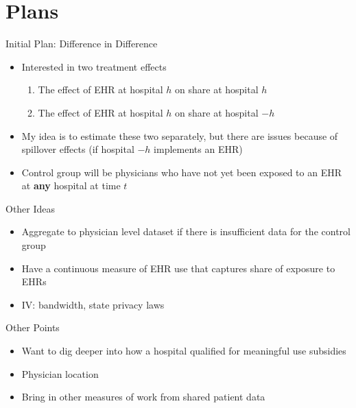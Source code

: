 \documentclass[10pt]{beamer}
\begin{document}
\section{Plans}

\begin{frame}{Initial Plan: Difference in Difference}
\begin{itemize}
    \item Interested in two treatment effects
    \begin{enumerate}
        \item The effect of EHR at hospital $h$ on share at hospital $h$
        \item The effect of EHR at hospital $h$ on share at hospital $-h$
    \end{enumerate}
    
    \vspace{2mm}
    
    \item My idea is to estimate these two separately, but there are issues because of spillover effects (if hospital $-h$ implements an EHR)
    
    \vspace{2mm}
    
    \item Control group will be physicians who have not yet been exposed to an EHR at \textbf{any} hospital at time $t$
\end{itemize}
\end{frame}

\begin{frame}{Other Ideas}
\begin{itemize}
    \item Aggregate to physician level dataset if there is insufficient data for the control group
    \item Have a continuous measure of EHR use that captures share of exposure to EHRs
    \item IV: bandwidth, state privacy laws
\end{itemize}
\end{frame}

\begin{frame}{Other Points}
\begin{itemize}
    \item Want to dig deeper into how a hospital qualified for meaningful use subsidies
    \item Physician location
    \item Bring in other measures of work from shared patient data
\end{itemize}
    
\end{frame}
\end{document}
